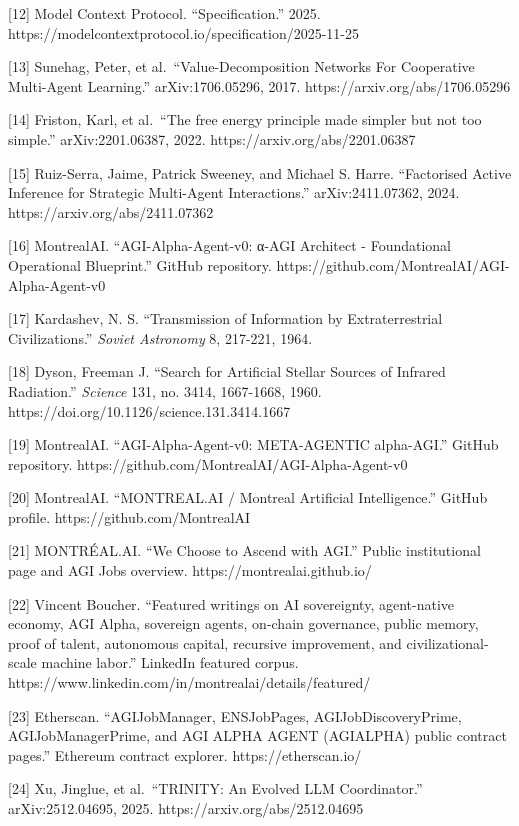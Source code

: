 \documentclass[
  11pt,
]{article}
\begin{document}
{[}12{]} Model Context Protocol. ``Specification.'' 2025.
https://modelcontextprotocol.io/specification/2025-11-25

{[}13{]} Sunehag, Peter, et al.~``Value-Decomposition Networks For
Cooperative Multi-Agent Learning.'' arXiv:1706.05296, 2017.
https://arxiv.org/abs/1706.05296

{[}14{]} Friston, Karl, et al.~``The free energy principle made simpler
but not too simple.'' arXiv:2201.06387, 2022.
https://arxiv.org/abs/2201.06387

{[}15{]} Ruiz-Serra, Jaime, Patrick Sweeney, and Michael S. Harre.
``Factorised Active Inference for Strategic Multi-Agent Interactions.''
arXiv:2411.07362, 2024. https://arxiv.org/abs/2411.07362

{[}16{]} MontrealAI. ``AGI-Alpha-Agent-v0: α-AGI Architect -
Foundational Operational Blueprint.'' GitHub repository.
https://github.com/MontrealAI/AGI-Alpha-Agent-v0

{[}17{]} Kardashev, N. S. ``Transmission of Information by
Extraterrestrial Civilizations.'' \emph{Soviet Astronomy} 8, 217-221,
1964.

{[}18{]} Dyson, Freeman J. ``Search for Artificial Stellar Sources of
Infrared Radiation.'' \emph{Science} 131, no. 3414, 1667-1668, 1960.
https://doi.org/10.1126/science.131.3414.1667

{[}19{]} MontrealAI. ``AGI-Alpha-Agent-v0: META-AGENTIC alpha-AGI.''
GitHub repository. https://github.com/MontrealAI/AGI-Alpha-Agent-v0

{[}20{]} MontrealAI. ``MONTREAL.AI / Montreal Artificial Intelligence.''
GitHub profile. https://github.com/MontrealAI

{[}21{]} MONTRÉAL.AI. ``We Choose to Ascend with AGI.'' Public
institutional page and AGI Jobs overview. https://montrealai.github.io/

{[}22{]} Vincent Boucher. ``Featured writings on AI sovereignty,
agent-native economy, AGI Alpha, sovereign agents, on-chain governance,
public memory, proof of talent, autonomous capital, recursive
improvement, and civilizational-scale machine labor.'' LinkedIn featured
corpus. https://www.linkedin.com/in/montrealai/details/featured/

{[}23{]} Etherscan. ``AGIJobManager, ENSJobPages, AGIJobDiscoveryPrime,
AGIJobManagerPrime, and AGI ALPHA AGENT (AGIALPHA) public contract
pages.'' Ethereum contract explorer. https://etherscan.io/

{[}24{]} Xu, Jinglue, et al.~``TRINITY: An Evolved LLM Coordinator.''
arXiv:2512.04695, 2025. https://arxiv.org/abs/2512.04695
\end{document}
